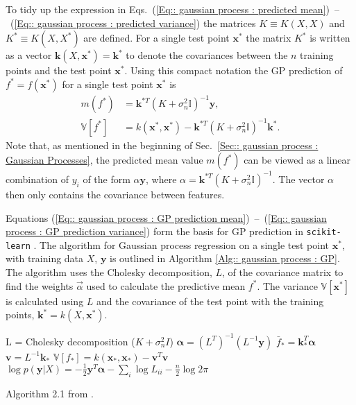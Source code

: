 \documentclass[twoside,english]{uiofysmaster}
\begin{document}
{To tidy up the expression in Eqs.~(\ref{Eq:: gaussian process : predicted mean})~--~(\ref{Eq:: gaussian process : predicted variance}) the matrices $K \equiv K(X, X)$ and $K^* \equiv K(X, X^*)$ are defined. For a single test point $\textbf{x}^*$ the matrix $K^*$ is written as a vector $\textbf{k}(X, \textbf{x}^*) = \textbf{k}^*$ to denote the covariances between the $n$ training points and the test point $\textbf{x}^*$. Using this compact notation the GP prediction of $f^*=f(\textbf{x}^*)$ for a single test point $\textbf{x}^*$ is
\begin{align}
m(f^*) &= \textbf{k}^{*T}(K + \sigma_n^2\mathbb{I})^{-1} \textbf{y},\label{Eq:: gaussian process : GP prediction mean}\\
\mathbb{V}[f^*] &= k(\textbf{x}^*, \textbf{x}^*) - \textbf{k}^{*T}(K + \sigma_n^2 \mathbb{I})^{-1} \textbf{k}^*\label{Eq:: gaussian process : GP prediction variance}.
\end{align}
Note that, as mentioned in the beginning of Sec.~\ref{Sec:: gaussian process : Gaussian Processes}, the predicted mean value $m(f^*)$ can be viewed as a linear combination of $y_i$ of the form $\alpha \textbf{y}$, where $\alpha = \textbf{k}^{*T}(K + \sigma_n^2\mathbb{I})^{-1}$. The vector $\alpha$ then only contains the covariance between features.

Equations (\ref{Eq:: gaussian process : GP prediction mean})~--~(\ref{Eq:: gaussian process : GP prediction variance}) form the basis for GP prediction in \verb|scikit-learn|  \cite{scikit-learn}. The algorithm for Gaussian process regression on a single test point $\textbf{x}^*$, with training data $X$, $\textbf{y}$ is outlined in Algorithm \ref{Alg:: gaussian process : GP}. The algorithm uses the Cholesky decomposition, $L$, of the covariance matrix to find the weights $\vec{\alpha}$ used to calculate the predictive mean $f^*$. The variance $\mathbb{V}[\textbf{x}^*]$ is calculated using $L$ and the covariance of the test point with the training points, $\textbf{k}^* = k(X, \textbf{x}^*)$.

\begin{algorithm}
L = Cholesky decomposition ($K + \sigma_n^2 I$) \;
$\boldsymbol{\alpha} = (L^T)^{-1}(L^{-1} \textbf{y})$ \;
$\bar{f}_* = \textbf{k}_*^T \boldsymbol{\alpha}$ \;
$\textbf{v} = L^{-1} \textbf{k}_*$ \;
$\mathbb{V}[f_*] = k(\textbf{x}_*, \textbf{x}_*) - \textbf{v}^T \textbf{v}$ \;
$\log p(\textbf{y}|X) = - \frac{1}{2} \textbf{y}^T \boldsymbol{\alpha} - \sum_i \log L_{ii} - \frac{n}{2} \log 2 \pi$ \;
\caption{Algorithm 2.1 from \cite{rasmussen2006gaussian}.}
\label{Alg:: gaussian process : GP}
\end{algorithm}




}
\end{document}
